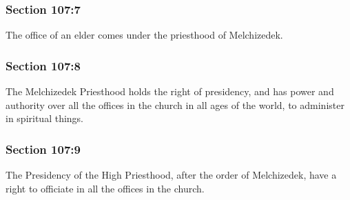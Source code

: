 	\subsubsection{Section 107:7} %
		\label{DC107-7}

		The office of an elder comes under the priesthood of Melchizedek.


	\subsubsection{Section 107:8} %
		\label{DC107-8}

		The Melchizedek Priesthood holds the right of presidency, and has power and authority over all the offices in the church in all ages of the world, to administer in spiritual things.


	\subsubsection{Section 107:9} %
		\label{DC107-9}

		The Presidency of the High Priesthood, after the order of Melchizedek, have a right to officiate in all the offices in the church.


